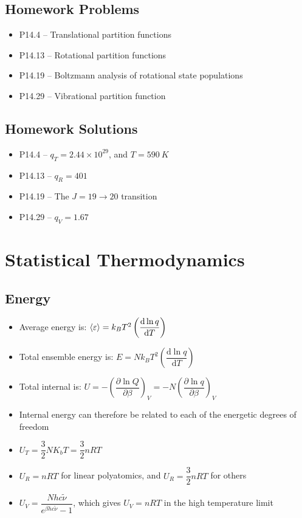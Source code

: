 \documentclass[12pt, openany, letterpaper]{memoir}
\begin{document}
\section*{Homework Problems}
\begin{itemize}
	\item P14.4 -- Translational partition functions
	\item P14.13 -- Rotational partition functions
	\item P14.19 -- Boltzmann analysis of rotational state populations
	\item P14.29 -- Vibrational partition function
\end{itemize}
\section*{Homework Solutions}
\begin{itemize}
	\item P14.4 -- $q_T = 2.44\times10^{29}$, and $T=590~K$
	\item P14.13 -- $q_R=401$
	\item P14.19 -- The $J=19\rightarrow20$ transition
	\item P14.29 -- $q_V=1.67$
\end{itemize}

\chapter{Statistical Thermodynamics}
\section*{Energy}
\begin{itemize}
	\item Average energy is: $\left< \varepsilon \right> = k_BT^2\left(\dfrac{\mathrm{d}\ln q}{\mathrm{d}T}\right)$
	\item Total ensemble energy is: $E = Nk_BT^2\left(\dfrac{\mathrm{d}\ln q}{\mathrm{d}T}\right)$
	\item Total internal is: $U=-\left(\dfrac{\partial\ln Q}{\partial\beta}\right)_V = -N\left(\dfrac{\partial\ln q}{\partial\beta}\right)_V$
	\item Internal energy can therefore be related to each of the energetic degrees of freedom
	\item $U_T = \dfrac{3}{2}NK_bT = \dfrac{3}{2}nRT$
	\item $U_R = nRT$ for linear polyatomics, and $U_R=\dfrac{3}{2}nRT$ for others
	\item $U_V = \dfrac{Nhc\tilde{\nu}}{e^{\beta hc\tilde{\nu}}-1}$, which gives $U_V = nRT$ in the high temperature limit
\end{itemize}
\end{document}
